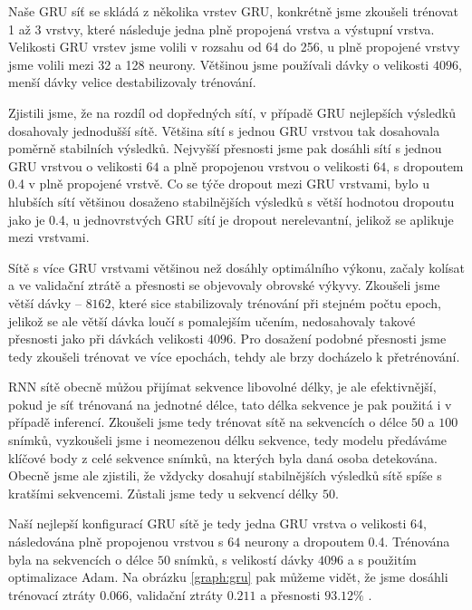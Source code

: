 Naše GRU síť se skládá z několika vrstev GRU, konkrétně jsme zkoušeli trénovat
1 až 3 vrstvy, které následuje jedna plně propojená vrstva a výstupní vrstva.
Velikosti GRU vrstev jsme volili v rozsahu od 64 do 256, u plně propojené
vrstvy jsme volili mezi 32 a 128 neurony. Většinou jsme používali dávky o
velikosti $4096$, menší dávky velice destabilizovaly trénování.

Zjistili jsme, že na rozdíl od dopředných sítí, v případě GRU nejlepších
výsledků dosahovaly jednodušší sítě. Většina sítí s jednou GRU vrstvou tak
dosahovala poměrně stabilních výsledků. Nejvyšší přesnosti jsme pak dosáhli
sítí s jednou GRU vrstvou o velikosti $64$ a plně propojenou vrstvou o
velikosti $64$, s dropoutem 0.4 v plně propojené vrstvě. Co se týče dropout
mezi GRU vrstvami, bylo u hlubších sítí většinou dosaženo stabilnějších
výsledků s větší hodnotou dropoutu jako je 0.4, u jednovrstvých GRU sítí je
dropout nerelevantní, jelikož se aplikuje mezi vrstvami.

Sítě s více GRU vrstvami většinou než dosáhly optimálního výkonu, začaly
kolísat a ve validační ztrátě a přesnosti se objevovaly obrovské výkyvy.
Zkoušeli jsme větší dávky – $8162$, které sice stabilizovaly trénování při
stejném počtu epoch, jelikož se ale větší dávka loučí s pomalejším učením,
nedosahovaly takové přesnosti jako při dávkách velikosti $4096$. Pro dosažení
podobné přesnosti jsme tedy zkoušeli trénovat ve více epochách, tehdy ale brzy
docházelo k přetrénování.

RNN sítě obecně můžou přijímat sekvence libovolné délky, je ale efektivnější,
pokud je síť trénovaná na jednotné délce, tato délka sekvence je pak použitá i
v případě inferencí. Zkoušeli jsme tedy trénovat sítě na sekvencích o délce
$50$ a $100$ snímků, vyzkoušeli jsme i neomezenou délku sekvence, tedy modelu
předáváme klíčové body z celé sekvence snímků, na kterých byla daná osoba
detekována. Obecně jsme ale zjistili, že vždycky dosahují stabilnějších
výsledků sítě spíše s kratšími sekvencemi. Zůstali jsme tedy u sekvencí délky
$50$.

Naší nejlepší konfigurací GRU sítě je tedy jedna GRU vrstva o velikosti $64$,
následována plně propojenou vrstvou s $64$ neurony a dropoutem 0.4. Trénována
byla na sekvencích o délce $50$ snímků, s velikostí dávky $4096$ a s použitím
optimalizace Adam. Na obrázku \ref{graph:gru} pak můžeme vidět, že jsme dosáhli
trénovací ztráty $0.066$, validační ztráty $0.211$ a přesnosti $93.12\%$ .

